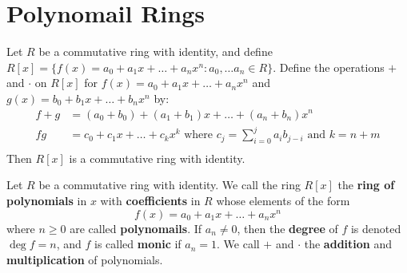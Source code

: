 \section{Polynomail Rings}
\label{section1}

\begin{theorem}\label{1.2.1}
    Let $R$ be a commutative ring with identity, and define $R[x]=
    \{f(x)=a_0+a_1x+\dots+a_nx^n : a_0, \dots a_n \in R\}$. Define the
    operations $+$ and  $\cdot$ on $R[x]$ for $f(x)=a_0+a_1x+\dots+a_nx^n$ and
    $g(x)=b_0+b_1x+\dots+b_nx^n$ by:
    \begin{align*}
        f+g &=  (a_0+b_0)+(a_1+b_1)x+\dots+(a_n+b_n)x^n \\
        fg  &=  c_0+c_1x+\dots+c_kx^k \text{ where }
        c_j=\sum_{i=0}^j{a_ib_{j-i}} \text{ and } k=n+m  \\
    \end{align*}
    Then $R[x]$ is a commutative ring with identity.
\end{theorem}

\begin{definition}
    Let $R$ be a commutative ring with identity. We call the ring $R[x]$ the
    \textbf{ring of polynomials} in $x$ with \textbf{coefficients} in $R$ whose
    elements of the form
    \begin{equation*}
        f(x)=a_0+a_1x+\dots+a_nx^n
    \end{equation*}
    where $n \geq 0$ are called \textbf{polynomails}. If $a_n \neq 0$, then the
     \textbf{degree} of $f$ is  denoted $\deg{f}=n$, and $f$ is called
     \textbf{monic} if $a_n=1$. We call $+$ and $\cdot$ the  \textbf{addition}
     and \textbf{multiplication} of polynomials.
\end{definition}

